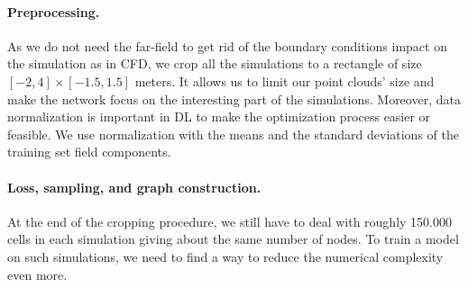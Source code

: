 \paragraph{Preprocessing.} As we do not need the far-field to get rid of the boundary conditions impact on the simulation as in \acrshort{CFD}, we crop all the simulations to a rectangle of size $[-2, 4]\times[-1.5, 1.5]$ meters. It allows us to limit our point clouds' size and make the network focus on the interesting part of the simulations. Moreover, data normalization is important in \acrshort{DL} to make the optimization process easier or feasible. We use normalization with the means and the standard deviations of the training set field components.

\paragraph{Loss, sampling, and graph construction.} At the end of the cropping procedure, we still have to deal with roughly \SI{150,000}{} cells in each simulation giving about the same number of nodes. To train a model on such simulations, we need to find a way to reduce the numerical complexity even more. 

